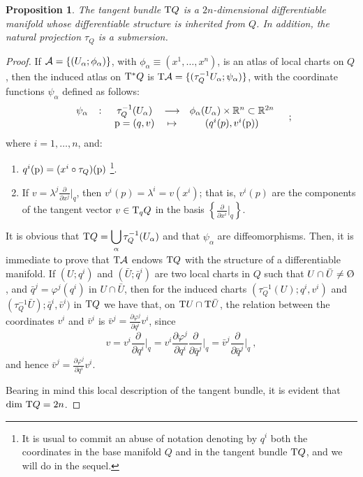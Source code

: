 \documentclass[12pt]{report}
\newtheorem{prop}[teor]{Proposition}
\def\ben{\begin{enumerate}}
\def\een{\end{enumerate}}
\def\dst{\displaystyle}
\def\derpar#1#2{\frac{\partial{#1}}{\partial{#2}}}
\def\coor#1#2#3{{#1}^{#2}, \ldots, {#1}^{#3}}
\def\buit{\hbox{\rm\O}}
\def\Real{\mathbb{R}}
\def\Tan{{\rm T}}
\begin{document}
\begin{appendix}
\begin{prop}
The tangent bundle $\Tan Q$ is a $2n$-dimensional differentiable manifold whose differentiable structure is inherited from $Q$.
In addition, the natural projection $\tau_Q$ is a submersion.
\end{prop}
\begin{proof}
If ${\cal A}=\{ (U_\alpha;\phi_\alpha)\}$, with $\phi_\alpha\equiv (\coor{x}{1}{n})$,
is an atlas of local charts on $Q$,
then the induced atlas on $\Tan^*Q$ is
$\Tan{\cal A}=\{ (\tau_Q^{-1}U_\alpha;\psi_\alpha) \}$,
with the coordinate functions $\psi_\alpha$ defined as follows:
$$
\begin{array}{ccccc}
\psi_\alpha&\colon&\tau^{-1}_Q(U_\alpha)&\longrightarrow&
\phi_\alpha(U_\alpha)\times\Real^n\subset\Real^{2n}\\
& & {\rm p}=(q,v) & \mapsto & (q^i(p),v^i({\rm p}))
\end{array} \quad ;
$$
where $i=1,\ldots,n$, and:
\ben
\item
$q^i({\rm p})=(x^i\circ\tau_Q)({\rm p})$
\footnote{
It is usual to commit an abuse of notation denoting by $q^i$
both the coordinates in the base manifold $Q$
and in the tangent bundle $\Tan Q$, and we will do in the sequel.}.
\item
If \(\dst v=\lambda^j\derpar{}{x^j}\Big\vert_q\), then
$v^i(p)=\lambda^i=v(x^i)$;
that is, $v^i(p)$ are the components of the tangent vector
$v\in\Tan_qQ$ in the basis \(\dst\left\{ \derpar{}{x^i}\Big\vert_q\right\}\).
\een
It is obvious that \(\dst\Tan Q=\bigcup_\alpha\tau^{-1}_Q(U_\alpha)\)
and that $\psi_\alpha$ are diffeomorphisms.
Then, it is immediate to prove that $\Tan{\cal A}$ endows $\Tan Q$
with the structure of a differentiable manifold.
If $(U;q^i)$ and $(\bar U;\bar q^i)$ are two local charts
in $Q$ such that 
$U\cap\bar U\not=\buit$, and $\bar q^j =\varphi^j (q^i)$ in $U\cap\bar U$,
then for the induced charts $(\tau^{-1}_Q(U);q^i,v^i)$ and 
$(\tau^{-1}_Q\bar U);\bar q^i,\bar v^i)$
in $\Tan Q$ we have that, on $\Tan U\cap\Tan\bar U$,
the relation between the coordinates $v^i$ and $\bar v^i$ is
\(\dst\bar v^j=\derpar{\varphi^j}{q^i}v^i\), since
$$
v=v^i\derpar{}{q^i}\Big\vert_q=v^i\derpar{\varphi^j}{q^i}\derpar{}{\bar q^j}\Big\vert_q=
\bar v^j\derpar{}{\bar q^j}\Big\vert_q \ ,
$$
and hence \(\dst\bar v^j=\derpar{\varphi^j}{q^i}v^i\).

Bearing in mind this local description of the tangent bundle,
it is evident that $\dim\,\Tan Q=2n$.


\end{proof}
\end{appendix}
\end{document}
